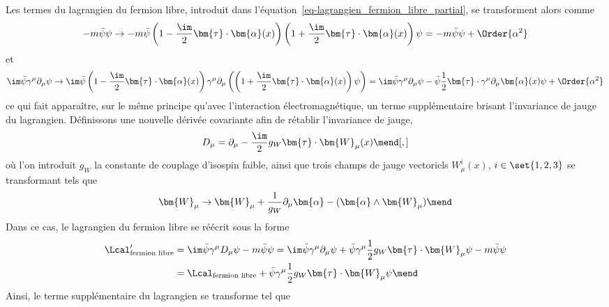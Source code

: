 Les termes du lagrangien du fermion libre, introduit dans l'équation~\eqref{eq-lagrangien_fermion_libre_partial}, se transforment alors comme
\begin{equation}
-m\bar{\psi}\psi
\to
-m\bar{\psi}\left(1-\frac{\im}{2}\bm{\tau}\cdot\bm{\alpha}(x)\right)\left(1+\frac{\im}{2}\bm{\tau}\cdot\bm{\alpha}(x)\right)\psi
=-m\bar{\psi}\psi+\Order{\alpha^2}
\end{equation}
et
\begin{equation}
\im\bar{\psi} \gamma^\mu\partial_\mu \psi
\to
\im \bar{\psi}\left(1-\frac{\im}{2}\bm{\tau}\cdot\bm{\alpha}(x)\right)\gamma^\mu\partial_\mu \left(\left(1+\frac{\im}{2}\bm{\tau}\cdot\bm{\alpha}(x)\right)\psi\right)
=
\im \bar{\psi}\gamma^\mu\partial_\mu \psi
-
\bar{\psi}\frac{1}{2}\bm{\tau}\cdot\gamma^\mu\partial_\mu\bm{\alpha}(x) \psi+\Order{\alpha^2}
\label{eq-chapter-MS-MSSM-section-formalisme-subsec-EW-tr_jauge-terme_cinetique}
\end{equation}
ce qui fait apparaître, sur le même principe qu'avec l'interaction électromagnétique, un terme supplémentaire brisant l'invariance de jauge du lagrangien. Définissons une nouvelle dérivée covariante afin de rétablir l'invariance de jauge,
\begin{equation}
D_\mu  = \partial_\mu  - \frac{\im}{2} g_W \bm{\tau}\cdot\bm{W}_\mu(x)
\mend[,]
\end{equation}
où l'on introduit $g_W$ la constante de couplage d'isospin faible, ainsi que trois champs de jauge vectoriels $W^i_\mu(x)$, $i\in\set{1,2,3}$ se transformant tels que
\begin{equation}
\bm{W}_\mu \to \bm{W}_\mu + \frac{1}{g_W}\partial_\mu\bm{\alpha} - (\bm{\alpha}\wedge\bm{W}_\mu)
\mend
\end{equation}
Dans ce cas, le lagrangien du fermion libre se réécrit sous la forme
\begin{align}
\Lcal_{\text{fermion libre}}'
&
= \im \bar{\psi} \gamma^\mu D_\mu \psi - m \bar{\psi}\psi
= \im \bar{\psi} \gamma^\mu \partial_\mu \psi + \bar{\psi} \gamma^\mu \frac{1}{2} g_W \bm{\tau}\cdot\bm{W}_\mu \psi - m \bar{\psi}\psi
\nonumber
\\&
=
\Lcal_{\text{fermion libre}}
+
\bar{\psi} \gamma^\mu \frac{1}{2} g_W \bm{\tau}\cdot\bm{W}_\mu \psi
\mend
\end{align}
Ainsi, le terme supplémentaire du lagrangien se transforme tel que
